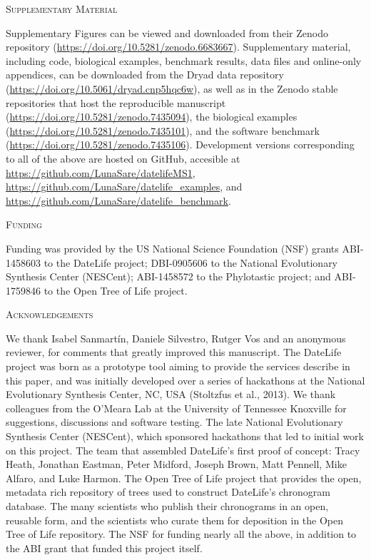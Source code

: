 \documentclass[english,man]{apa6}
\begin{document}
\begin{center}
\textsc{Supplementary Material}
\end{center}

Supplementary Figures can be viewed and downloaded from their Zenodo repository (\url{https://doi.org/10.5281/zenodo.6683667}).
Supplementary material, including code, biological examples, benchmark results, data files and online-only appendices, can be downloaded from the Dryad data repository (\url{https://doi.org/10.5061/dryad.cnp5hqc6w}), as well as in the Zenodo stable repositories that host the reproducible manuscript (\url{https://doi.org/10.5281/zenodo.7435094}), the biological examples (\url{https://doi.org/10.5281/zenodo.7435101}), and the software benchmark (\url{https://doi.org/10.5281/zenodo.7435106}). Development versions corresponding to all of the above are hosted on GitHub, accesible at \url{https://github.com/LunaSare/datelifeMS1}, \url{https://github.com/LunaSare/datelife_examples}, and \url{https://github.com/LunaSare/datelife_benchmark}.

\begin{center}
\textsc{Funding}
\end{center}

Funding was provided by the US National Science Foundation (NSF) grants ABI-1458603 to the DateLife project; DBI-0905606 to the National Evolutionary Synthesis Center (NESCent); ABI-1458572 to the Phylotastic project; and ABI-1759846 to the Open Tree of Life project.

\begin{center}
\textsc{Acknowledgements}
\end{center}

We thank Isabel Sanmartín, Daniele Silvestro, Rutger Vos and an anonymous reviewer, for comments that greatly improved this manuscript.
The DateLife project was born as a prototype tool aiming to provide the services describe in this paper, and was initially developed over a series of hackathons at the National Evolutionary Synthesis Center, NC, USA (Stoltzfus et al., 2013).
We thank colleagues from the O'Meara Lab at the University
of Tennessee Knoxville for suggestions, discussions and software testing.
The late National Evolutionary Synthesis Center (NESCent), which sponsored hackathons
that led to initial work on this project. The team that assembled DateLife's first proof of concept: Tracy Heath, Jonathan Eastman, Peter Midford, Joseph Brown, Matt Pennell, Mike Alfaro, and Luke Harmon.
The Open Tree of Life project that provides the open, metadata rich repository of
trees used to construct DateLife's chronogram database.
The many scientists who publish their chronograms in an open, reusable form, and the scientists who curate them for deposition in the Open Tree of Life repository.
The NSF for funding nearly all the above, in addition to the ABI grant that funded this project itself.
\end{document}
